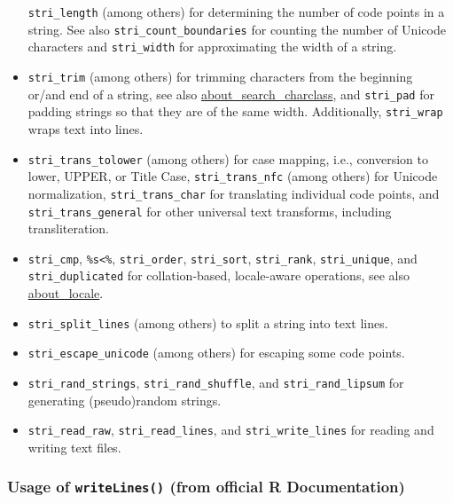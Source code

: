 \documentclass[
]{article}
\begin{document}
\begin{itemize}
  \texttt{stri\_length} (among others) for determining the number of
  code points in a string. See also \texttt{stri\_count\_boundaries} for
  counting the number of Unicode characters and \texttt{stri\_width} for
  approximating the width of a string.
\item
  \texttt{stri\_trim} (among others) for trimming characters from the
  beginning or/and end of a string, see also
  \href{vscode-webview://00i87qrgljff0t3jmc9gjufilst9usetvkh9gn773om0ic67o1j2/stringi/help/about_search_charclass}{about\_search\_charclass},
  and \texttt{stri\_pad} for padding strings so that they are of the
  same width. Additionally, \texttt{stri\_wrap} wraps text into lines.
\item
  \texttt{stri\_trans\_tolower} (among others) for case mapping, i.e.,
  conversion to lower, UPPER, or Title Case, \texttt{stri\_trans\_nfc}
  (among others) for Unicode normalization, \texttt{stri\_trans\_char}
  for translating individual code points, and
  \texttt{stri\_trans\_general} for other universal text transforms,
  including transliteration.
\item
  \texttt{stri\_cmp}, \texttt{\%s\textless{}\%}, \texttt{stri\_order},
  \texttt{stri\_sort}, \texttt{stri\_rank}, \texttt{stri\_unique}, and
  \texttt{stri\_duplicated} for collation-based, locale-aware
  operations, see also
  \href{vscode-webview://00i87qrgljff0t3jmc9gjufilst9usetvkh9gn773om0ic67o1j2/stringi/help/about_locale}{about\_locale}.
\item
  \texttt{stri\_split\_lines} (among others) to split a string into text
  lines.
\item
  \texttt{stri\_escape\_unicode} (among others) for escaping some code
  points.
\item
  \texttt{stri\_rand\_strings}, \texttt{stri\_rand\_shuffle}, and
  \texttt{stri\_rand\_lipsum} for generating (pseudo)random strings.
\item
  \texttt{stri\_read\_raw}, \texttt{stri\_read\_lines}, and
  \texttt{stri\_write\_lines} for reading and writing text files.
\end{itemize}

\hypertarget{usage-of-writelines-from-official-r-documentation}{%
\subsubsection{\texorpdfstring{Usage of \texttt{writeLines()} (from
official R
Documentation)}{Usage of writeLines() (from official R Documentation)}}\label{usage-of-writelines-from-official-r-documentation}}
\end{document}
